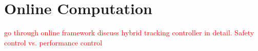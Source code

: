 \section{Online Computation \label{sec:online}}
\textcolor{red}{go through online framework}
\textcolor{red}{discuss hybrid tracking controller in detail.  Safety control vs. performance control}